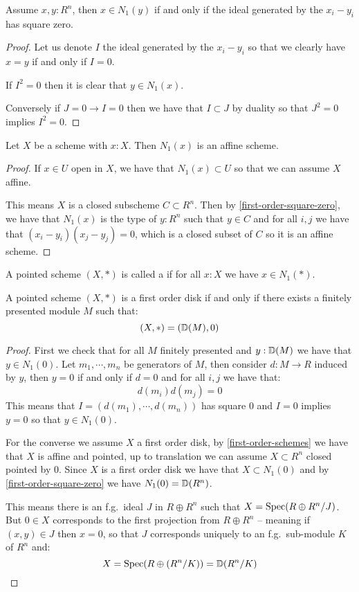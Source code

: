 \begin{lemma}\label{first-order-square-zero}
Assume $x,y:R^n$, then $x\in N_1(y)$ if and only if the ideal generated by the $x_i-y_i$ has square zero.
\end{lemma}

\begin{proof}
Let us denote $I$ the ideal generated by the $x_i-y_i$ so that we clearly have $x=y$ if and only if $I=0$. 

If $I^2=0$ then it is clear that $y\in N_1(x)$.

Conversely if $J=0 \to I=0$ then we have that $I\subset J$ by duality so that $J^2=0$ implies $I^2=0$.
\end{proof}

\begin{lemma}\label{first-order-schemes}
Let $X$ be a scheme with $x:X$. Then $N_1(x)$ is an affine scheme.
\end{lemma}

\begin{proof}
If $x\in U$ open in $X$, we have that $N_1(x)\subset U$ so that we can assume $X$ affine.

This means $X$ is a closed subscheme $C\subset R^n$. Then by \cref{first-order-square-zero}, we have that $N_1(x)$ is the type of $y:R^n$ such that $y\in C$ and for all $i,j$ we have that $(x_i-y_i)(x_j-y_j) = 0$, which is a closed subset of $C$ so it is an affine scheme.
\end{proof}

\begin{definition}
A pointed scheme $(X,*)$ is called a  if for all $x:X$ we have $x\in N_1(*)$.
\end{definition}

\begin{lemma}\label{disk-are-infinitesimal}
A pointed scheme $(X,*)$ is a first order disk if and only if there exists a finitely presented module $M$ such that:
\[(X,*) = (\mathbb{D}(M),0)\]
\end{lemma}

\begin{proof}
First we check that for all $M$ finitely presented and $y:\mathbb{D}(M)$ we have that $y\in N_1(0)$. Let $m_1,\cdots, m_n$ be generators of $M$, then consider $d:M\to R$ induced by $y$, then $y=0$ if and only if $d=0$ and for all $i,j$ we have that:
\[d(m_i)d(m_j) = 0\]
This means that $I = (d(m_1),\cdots,d(m_n))$ has square $0$ and $I=0$ implies $y=0$ so that $y\in N_1(0)$.

For the converse we assume $X$ a first order disk, by \cref{first-order-schemes} we have that $X$ is affine and pointed, up to translation we can assume $X\subset R^n$ closed pointed by $0$. Since $X$ is a first order disk we have that $X\subset N_1(0)$ and by \cref{first-order-square-zero} we have $N_1(0) = \mathbb{D}(R^n)$.

This means there is an f.g.\ ideal $J$ in $R\oplus R^n$ such that $X=\operatorname{Spec}(R\oplus R^n / J)$.
But $0\in X$ corresponds to the first projection from $R\oplus R^n$ -- meaning if $(x,y)\in J$ then $x=0$, so that $J$ corresponds uniquely to an f.g.\ sub-module $K$ of $R^n$ and:
\[X = \operatorname{Spec}(R\oplus (R^n/K)) = \mathbb{D}(R^n/K)\] 
\end{proof}

